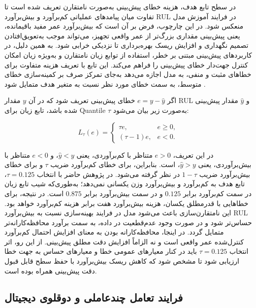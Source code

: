 \documentclass[a4paper,fleqn]{report}
\begin{document}
در سطح تابع هدف، هزینه خطای پیش‌بینی به‌صورت نامتقارن
تعریف شده است تا تفاوت میان پیامدهای عملیاتی کم‌برآورد و
بیش‌برآورد \gls{RUL} در فرایند آموزش مدل منعکس شود. در این
چارچوب، فرض بر آن است که بیش‌برآورد عمر مفید باقیمانده، یعنی
پیش‌بینی مقداری بزرگ‌تر از عمر واقعی تجهیز، می‌تواند موجب
به‌تعویق‌افتادن تصمیم نگهداری و افزایش ریسک بهره‌برداری تا
نزدیکی خرابی شود. به همین دلیل، در کاربردهای پیش‌بینی مبتنی بر
خطر، استفاده از توابع زیان نامتقارن و به‌ویژه زیان
 امکان کنترل جهت‌دار خطای پیش‌بینی را فراهم
می‌کند. این تابع با تعریف هزینه متفاوت برای خطاهای مثبت و منفی،
به مدل اجازه می‌دهد به‌جای تمرکز صرف بر کمینه‌سازی خطای متوسط،
به سمت خطای مورد نظر نسبت به متغیر هدف متمایل شود
\cite{Robinson2026riskaware}.

اگر $e=y-\hat{y}$ خطای پیش‌بینی تعریف شود که در آن $y$ مقدار
\gls{RUL}
و $\hat{y}$ مقدار پیش‌بینی شده باشد، تابع زیان 
برای
\gls{Quantile}
 $\tau$ به‌صورت زیر بیان می‌شود:

\begin{equation}
	\label{eq:pinball-loss}
	L_{\tau}(e)
	=
	\begin{cases}
		\tau e, & e \geq 0,\\
		(\tau-1)e, & e < 0.
	\end{cases}
\end{equation}

در این تعریف، 
$e>0$
 متناظر با کم‌برآوردی، یعنی
$\hat{y}<y$،
 و 
 $e<0$ 
 متناظر با بیش‌برآوردی، یعنی
$\hat{y}>y$، است. بنابراین، برای خطای کم‌برآورد ضریب $\tau$ و
برای خطای بیش‌برآورد ضریب $1-\tau$ در نظر گرفته می‌شود. در
پژوهش حاضر با انتخاب $\tau=0.125$، تابع هدف به کم‌برآورد و
بیش‌برآورد وزن یکسانی نمی‌دهد؛ به‌طوری‌که شیب تابع زیان در سمت
کم‌برآورد برابر $0.125$ و در سمت بیش‌برآورد برابر $0.875$ است.
در نتیجه، برای خطاهایی با قدرمطلق یکسان، هزینه بیش‌برآورد
هفت برابر هزینه کم‌برآورد خواهد بود. این نامتقارن‌سازی باعث
می‌شود مدل در فرایند بهینه‌سازی نسبت به بیش‌برآورد \gls{RUL}
حساس‌تر شود و در صورت وجود عدم‌قطعیت در داده، به سمت برآورد
محافظه‌کارانه‌تر متمایل گردد. در اینجا، محافظه‌کارانه بودن به
معنای افزایش احتمال کم‌برآورد کنترل‌شده عمر واقعی است و نه
الزاماً افزایش دقت مطلق پیش‌بینی. از این رو، اثر انتخاب
$\tau=0.125$
 باید در کنار معیارهای عمومی خطا و معیارهای حساس
به جهت خطا ارزیابی شود تا مشخص شود که کاهش ریسک بیش‌برآورد با
حفظ سطح قابل قبول دقت پیش‌بینی همراه بوده است.

\subsection{فرایند تعامل چندعاملی و دوقلوی دیجیتال}
\label{sec:e2e-scenario}
\end{document}
